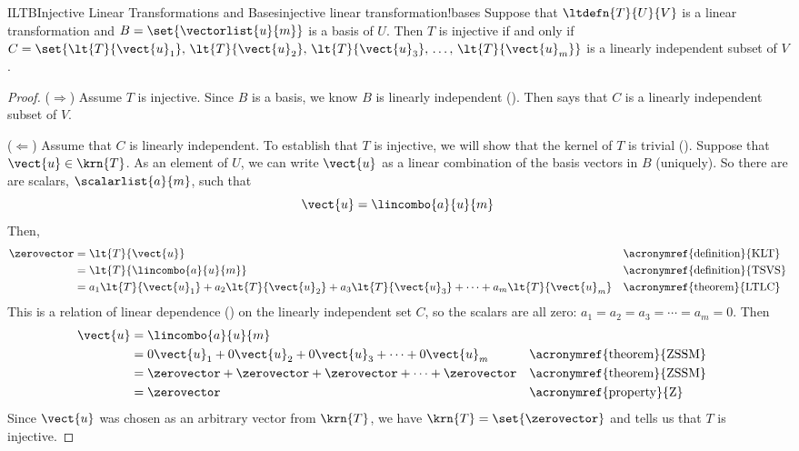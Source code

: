 %
\begin{theorem}{ILTB}{Injective Linear Transformations and Bases}{injective linear transformation!bases}
Suppose that $\ltdefn{T}{U}{V}$ is a linear transformation and $B=\set{\vectorlist{u}{m}}$ is a basis of $U$.  Then $T$ is injective if and only if $C=\set{\lt{T}{\vect{u}_1},\,\lt{T}{\vect{u}_2},\,\lt{T}{\vect{u}_3},\,\ldots,\,\lt{T}{\vect{u}_m}}$ is a linearly independent subset of $V$.
\end{theorem}
%
\begin{proof}
%
($\Rightarrow$)  Assume $T$ is injective.  Since $B$ is a basis, we know $B$ is linearly independent ().  Then  says that $C$ is a linearly independent subset of $V$.\par
%
($\Leftarrow$)  Assume that $C$ is linearly independent.  To establish that $T$ is injective, we will show that the kernel of $T$ is trivial ().  Suppose that $\vect{u}\in\krn{T}$.  As an element of $U$, we can write $\vect{u}$ as a linear combination of the basis vectors in $B$ (uniquely).  So there are are scalars, $\scalarlist{a}{m}$, such that
%
\begin{equation*}
\vect{u}=\lincombo{a}{u}{m}
\end{equation*}
%
Then,
%
\begin{align*}
\zerovector
&=\lt{T}{\vect{u}}
&&\text{\acronymref{definition}{KLT}}\\
%
&=\lt{T}{\lincombo{a}{u}{m}}
&&\text{\acronymref{definition}{TSVS}}\\
%
&=a_1\lt{T}{\vect{u}_1}+a_2\lt{T}{\vect{u}_2}+a_3\lt{T}{\vect{u}_3}+\cdots+a_m\lt{T}{\vect{u}_m}
&&\text{\acronymref{theorem}{LTLC}}
%
\end{align*}
%
This is a relation of linear dependence () on the linearly independent set $C$, so the scalars are all zero:  $a_1=a_2=a_3=\cdots=a_m=0$.  Then
%
\begin{align*}
\vect{u}&=\lincombo{a}{u}{m}\\
&=0\vect{u}_1+0\vect{u}_2+0\vect{u}_3+\cdots+0\vect{u}_m&&\text{\acronymref{theorem}{ZSSM}}\\
&=\zerovector+\zerovector+\zerovector+\cdots+\zerovector&&\text{\acronymref{theorem}{ZSSM}}\\
&=\zerovector&&\text{\acronymref{property}{Z}}
\end{align*}
%
Since $\vect{u}$ was chosen as an arbitrary vector from $\krn{T}$, we have $\krn{T}=\set{\zerovector}$ and  tells us that $T$ is injective.
%
\end{proof}
